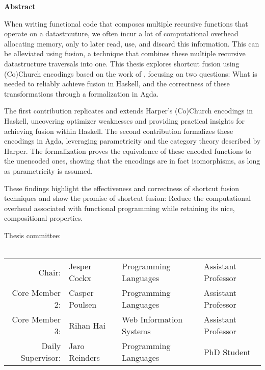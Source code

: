 \thispagestyle{plain}
\begin{center}
    \Large
    \textbf{\thetitle}
        
    \vspace{0.4cm}
    \large
    \thesubtitle
        
    \vspace{0.4cm}
    \textbf{\thename}
       
    \vspace{1.9cm}
    \textbf{Abstract}
\end{center}
\begin{adjustwidth}{2cm}{2cm}
When writing functional code that composes multiple recursive functions that operate on a datastrcuture, we often incur a lot of computational overhead allocating memory, only to later read, use, and discard this information.
This can be alleviated using fusion, a technique that combines these multiple recursive datastructure traversals into one.
This thesis explores shortcut fusion using (Co)Church encodings based on the work of \cite{Harper2011}, focusing on two questions: What is needed to reliably achieve fusion in Haskell, and the correctness of these transformations through a formalization in Agda.

The first contribution replicates and extends Harper's (Co)Church encodings in Haskell, uncovering optimizer weaknesses and providing practical insights for achieving fusion within Haskell.
The second contribution formalizes these encodings in Agda, leveraging parametricity and the category theory described by Harper.
The formalization proves the equivalence of these encoded functions to the unencoded ones, showing that the encodings are in fact isomorphisms, as long as parametricity \citep{Wadler1989} is assumed.

These findings highlight the effectiveness and correctness of shortcut fusion techniques and show the promise of shortcut fusion: Reduce the computational overhead associated with functional programming while retaining its nice, compositional properties.
\end{adjustwidth}

\vfill 

\begin{center}
    Thesis committee:\\~\\
    \begin{tabular}{r l l l}
        Chair: & Jesper Cockx & Programming Languages & Assistant Professor \\
        Core Member 2: & Casper Poulsen & Programming Languages & Assistant Professor \\
        Core Member 3: & Rihan Hai & Web Information Systems & Assistant Professor \\
        Daily Supervisor: & Jaro Reinders & Programming Languages & PhD Student 
    \end{tabular}
\end{center}
\vspace{1cm}
\pagebreak